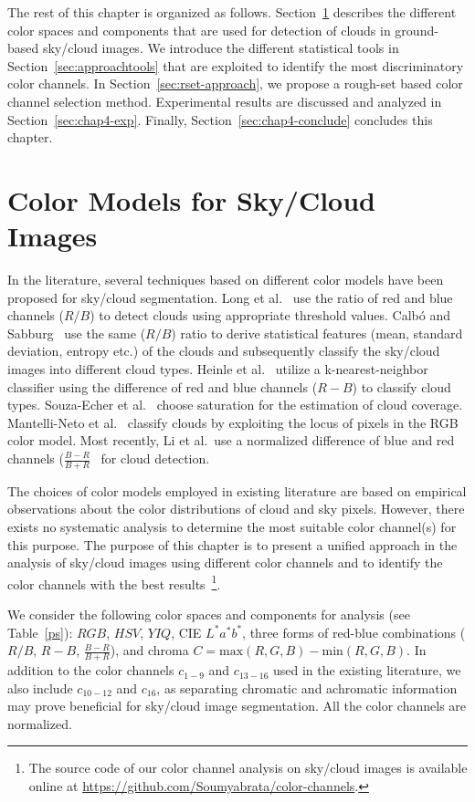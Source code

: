 The rest of this chapter is organized as follows. Section~\ref{sec:colorchannels} describes the different color spaces and components that are used for detection of clouds in ground-based sky/cloud images. We introduce the different statistical tools in Section~\ref{sec:approachtools} that are exploited to identify the most discriminatory color channels. In Section~\ref{sec:rset-approach}, we propose a rough-set based color channel selection method. Experimental results are discussed and analyzed in Section~\ref{sec:chap4-exp}. Finally, Section~\ref{sec:chap4-conclude} concludes this chapter. 


\section{Color Models for Sky/Cloud Images}
\label{sec:colorchannels}

In the literature, several techniques based on different color models have been proposed for sky/cloud segmentation. Long et al.\  \cite{Long} use the ratio of red and blue channels ($R/B$) to detect clouds using appropriate threshold values. Calb{\'{o}} and Sabburg~\cite{Calbo2008} use the same ($R/B$) ratio to derive statistical features (mean, standard deviation, entropy etc.) of the clouds and subsequently classify the sky/cloud images into different cloud types. Heinle et al.\ \cite{Heinle2010} utilize a k-nearest-neighbor classifier using the difference of red and blue channels ($R-B$) to classify cloud types. Souza-Echer et al.\ \cite{Souza} choose saturation for the estimation of cloud coverage. Mantelli-Neto et al.\ \cite{Sylvio} classify clouds by exploiting the locus of pixels in the RGB color model. Most recently, Li et al.\ use a normalized difference of blue and red channels ($\frac{B-R}{B+R}$~\cite{Li2011} for cloud detection.

The choices of color models employed in existing literature are based on empirical observations about the color distributions of cloud and sky pixels.  However, there exists no systematic analysis to determine the most suitable color channel(s) for this purpose. The purpose of this chapter is to present a unified approach in the analysis of sky/cloud images using different color channels and to identify the color channels with the best results~\footnote{The source code of our color channel analysis on sky/cloud images is available online at \url{https://github.com/Soumyabrata/color-channels}.}.

We consider the following color spaces and components for analysis (see Table~\ref{ps}): $RGB$, $HSV$, $YIQ$, CIE $L^{*}a^{*}b^{*}$, three forms of red-blue combinations ($R/B$, $R-B$, $\frac{B-R}{B+R}$), and chroma $C=\mbox{max}(R,G,B)-\mbox{min}(R,G,B)$. In addition to the color channels $c_{1-9}$ and $c_{13-16}$ used in the existing literature, we also include $c_{10-12}$ and $c_{16}$, as separating chromatic and achromatic information may prove beneficial for sky/cloud image segmentation. All the color channels are normalized.


